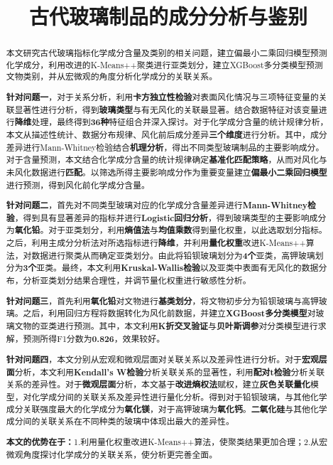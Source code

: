\documentclass[withoutpreface,bwprint]{cumcmthesis} %
\title{古代玻璃制品的成分分析与鉴别}
\begin{document}
 \maketitle
 \begin{abstract}


本文研究古代玻璃指标化学成分含量及类别的相关问题，建立偏最小二乘回归模型预测化学成分，利用改进的K-Means++聚类进行亚类划分，建立XGBoost多分类模型预测文物类别，并从宏微观的角度分析化学成分的关联关系。

\textbf{针对问题一}，对于关系分析，利用\textbf{卡方独立性检验}对表面风化情况与三项特征变量的关联显著性进行分析，得到\textbf{玻璃类型}与有无风化的关联最显著。结合数据特征对该变量进行\textbf{降维}处理，最终得到\textbf{36种}特征组合并深入探讨。对于化学成分含量的统计规律分析，本文从描述性统计、数据分布规律、风化前后成分差异\textbf{三个维度}进行分析。其中，成分差异进行Mann-Whitney检验结合\textbf{机理分析}，得出不同类型玻璃制品的主要影响成分。对于含量预测，本文结合化学成分含量的统计规律确定\textbf{基准化匹配策略}，从而对风化与未风化数据进行\textbf{匹配}。以筛选所得主要影响成分作为重要变量建立\textbf{偏最小二乘回归模型}进行预测，得到风化前化学成分含量。


\textbf{针对问题二}，首先对不同类型玻璃对应的化学成分含量差异进行\textbf{Mann-Whitney检验}，得到具有显著差异的指标并进行\textbf{Logistic回归分析}，得到玻璃类型的主要影响成分为\textbf{氧化铅}。对于亚类划分，利用\textbf{熵值法}与\textbf{均值乘数}得到量化权重，以此选取划分指标。之后，利用主成分分析法对所选指标进行\textbf{降维}，并利用\textbf{量化权重}改进K-Means++算法，对数据进行聚类从而确定亚类划分。由此将铅钡玻璃划分为\textbf{4个}亚类，高钾玻璃划分为\textbf{3个}亚类。最终，本文利用\textbf{Kruskal-Wallis检验}以及亚类中表面有无风化的数据分布，分析亚类划分结果合理性，并调节量化权重进行敏感性分析。


\textbf{针对问题三}，首先利用\textbf{氧化铅}对文物进行\textbf{基类划分}，将文物初步分为铅钡玻璃与高钾玻璃。之后，利用回归方程将数据转化为风化前数据，并建立\textbf{XGBoost多分类模型}对玻璃文物的亚类进行预测。其中，本文利用\textbf{K折交叉验证}与\textbf{贝叶斯调参}对分类模型进行求解，预测所得F1分数为\textbf{0.826}，效果较好。

\textbf{针对问题四}，本文分别从宏观和微观层面对关联关系以及差异性进行分析。对于\textbf{宏观层面}分析，本文利用\textbf{Kendall's W检验}分析关联关系的显著性，利用\textbf{配对t检验}分析关联关系的差异性。对于\textbf{微观层面}分析，本文基于\textbf{改进熵权法}赋权，建立\textbf{灰色关联量化}模型，对化学成分间的关联关系及差异性进行量化分析。得到对于铅钡玻璃，与其他化学成分关联强度最大的化学成分为\textbf{氧化镁}，对于高钾玻璃为\textbf{氧化钙}。\textbf{二氧化硅}与其他化学成分间的关联关系在不同种类的玻璃中体现出最大的差异性。

\textbf{本文的优势在于：}1.利用量化权重改进K-Means++算法，使聚类结果更加合理；2.从宏微观角度探讨化学成分的关联关系，使分析更完善全面。

\end{abstract}
\end{document}

